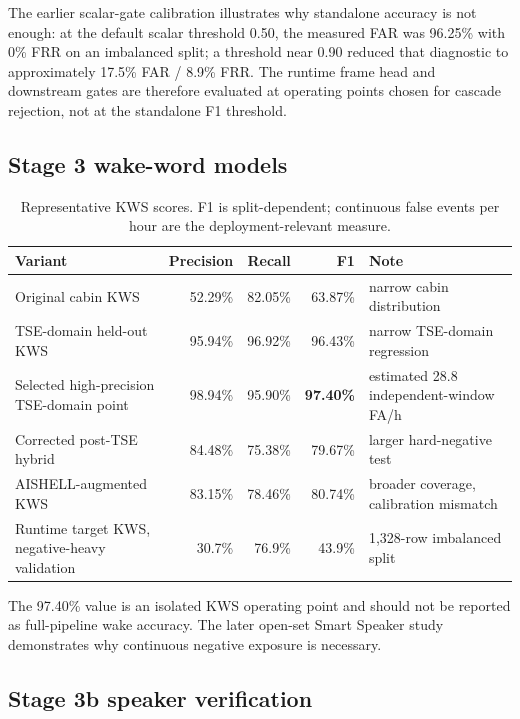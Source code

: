 \documentclass[11pt,a4paper]{article}
\begin{document}
The earlier scalar-gate calibration illustrates why standalone accuracy is
not enough: at the default scalar threshold 0.50, the measured FAR was
96.25\% with 0\% FRR on an imbalanced split; a threshold near 0.90 reduced
that diagnostic to approximately 17.5\% FAR / 8.9\% FRR. The runtime frame
head and downstream gates are therefore evaluated at operating points chosen
for cascade rejection, not at the standalone F1 threshold.

\subsection{Stage 3 wake-word models}

\begin{table}[H]
\centering
\caption{Representative KWS scores. F1 is split-dependent; continuous
false events per hour are the deployment-relevant measure.}
\label{tab:kws}
\small
\begin{tabularx}{\linewidth}{@{}lrrrY@{}}
\toprule
\textbf{Variant} & \textbf{Precision} & \textbf{Recall} & \textbf{F1} & \textbf{Note}\\
\midrule
Original cabin KWS & 52.29\% & 82.05\% & 63.87\% & narrow cabin distribution\\
TSE-domain held-out KWS & 95.94\% & 96.92\% & 96.43\% & narrow TSE-domain regression\\
Selected high-precision TSE-domain point & 98.94\% & 95.90\% & \textbf{97.40\%} & estimated 28.8 independent-window FA/h\\
Corrected post-TSE hybrid & 84.48\% & 75.38\% & 79.67\% & larger hard-negative test\\
AISHELL-augmented KWS & 83.15\% & 78.46\% & 80.74\% & broader coverage, calibration mismatch\\
Runtime target KWS, negative-heavy validation & 30.7\% & 76.9\% & 43.9\% & 1,328-row imbalanced split\\
\bottomrule
\end{tabularx}
\end{table}

The 97.40\% value is an isolated KWS operating point and should not be
reported as full-pipeline wake accuracy. The later open-set Smart Speaker
study demonstrates why continuous negative exposure is necessary.

\subsection{Stage 3b speaker verification}
\end{document}
